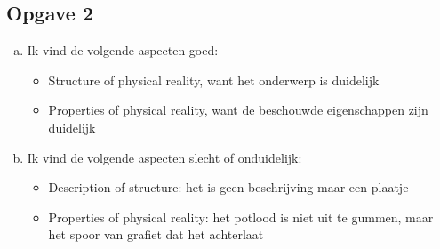\documentclass{article}
\begin{document}
\subsection*{Opgave 2}
\begin{enumerate}[a)]
 \item %
  Ik vind de volgende aspecten goed:%
  \begin{itemize}
   \item Structure of physical reality, want het onderwerp is duidelijk
   \item Properties of physical reality, want de beschouwde eigenschappen zijn duidelijk
  \end{itemize}

 \item %
  Ik vind de volgende aspecten slecht of onduidelijk:
  \begin{itemize}
   \item Description of structure: het is geen beschrijving maar een plaatje
   \item Properties of physical reality: het potlood is niet uit te gummen, maar het spoor van grafiet dat het achterlaat
 \end{itemize}
\end{enumerate}
\end{document}
